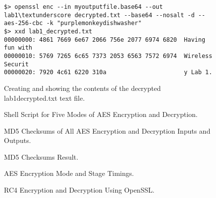\documentclass{article}
\begin{document}
\begin{figure}
\begin{mdframed}
\begin{lstlisting}
$> openssl enc --in myoutputfile.base64 --out lab1\textunderscore decrypted.txt --base64 --nosalt -d --aes-256-cbc -k "purplemonkeydishwasher"
$> xxd lab1_decrypted.txt
00000000: 4861 7669 6e67 2066 756e 2077 6974 6820  Having fun with 
00000010: 5769 7265 6c65 7373 2053 6563 7572 6974  Wireless Securit
00000020: 7920 4c61 6220 310a                      y Lab 1.
\end{lstlisting}
\end{mdframed}
\caption{Creating and showing the contents of the decrypted lab1\textunderscore decrypted.txt text file.}
\label{fig:step1e}
\end{figure}

\begin{figure}
\begin{mdframed}

\end{mdframed}
\caption{Shell Script for Five Modes of AES Encryption and Decryption.}
\label{fig:step1fa}
\end{figure}

\begin{figure}
\begin{mdframed}

\end{mdframed}
\caption{MD5 Checksums of All AES Encryption and Decryption Inputs and Outputs.}
\label{fig:step1fb}
\end{figure}

\begin{figure}
\begin{mdframed}

\end{mdframed}
\caption{MD5 Checksums Result.}
\label{fig:step1fc}
\end{figure}

\begin{figure}
\begin{mdframed}

\end{mdframed}
\caption{AES Encryption Mode and Stage Timings.}
\label{fig:step1fd}
\end{figure}

\begin{figure}
\begin{mdframed}

\end{mdframed}
\caption{RC4 Encryption and Decryption Using OpenSSL.}
\label{fig:step2ba}
\end{figure}
\end{document}
